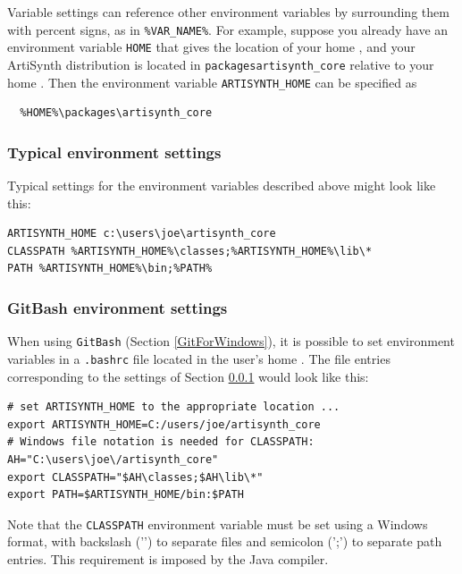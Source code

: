 Variable settings can reference other environment variables by
surrounding them with percent signs, as in {\tt \%VAR\_NAME\%}.  For
example, suppose you already have an environment variable {\tt HOME} that
gives the location of your home \directory{}, and your ArtiSynth
distribution is located in {\tt packages\SEP artisynth\_core} relative to your
home \directory{}. Then the environment variable {\tt ARTISYNTH\_HOME} can be
specified as

\begin{verbatim}
  %HOME%\packages\artisynth_core
\end{verbatim}

\subsubsection{Typical environment settings}
\label{TypicalEnvironment}

Typical settings for the environment variables described above might
look like this:

\begin{lstlisting}[]
ARTISYNTH_HOME c:\users\joe\artisynth_core
CLASSPATH %ARTISYNTH_HOME%\classes;%ARTISYNTH_HOME%\lib\*
PATH %ARTISYNTH_HOME%\bin;%PATH%
\end{lstlisting}

\subsubsection{GitBash environment settings}
\label{GitBashEnvironmentSettings}

When using {\tt GitBash} (Section \ref{GitForWindows}), it is
possible to set environment variables in a {\tt .bashrc} file located
in the user's home \directory{}. The file entries corresponding
to the settings of Section \ref{TypicalEnvironment}
would look like this:

\begin{lstlisting}[]
# set ARTISYNTH_HOME to the appropriate location ...
export ARTISYNTH_HOME=C:/users/joe/artisynth_core
# Windows file notation is needed for CLASSPATH:
AH="C:\users\joe\/artisynth_core"
export CLASSPATH="$AH\classes;$AH\lib\*"
export PATH=$ARTISYNTH_HOME/bin:$PATH
\end{lstlisting}

Note that the {\tt CLASSPATH} environment variable must be set using a
Windows format, with backslash ('\BKS') to separate files and
semicolon (';') to separate path entries. This requirement is
imposed by the Java compiler.
\fi %

